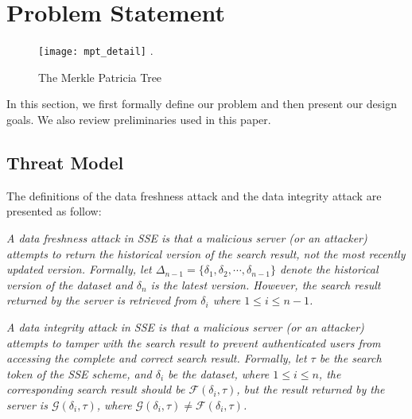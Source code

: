 \section{Problem Statement}
\begin{figure*}[t]
\centering
\texttt{[image: mpt\_detail]}
\DeclareGraphicsExtensions.
\caption{The Merkle Patricia Tree}
\label{fig:mpt_detail}
\end{figure*}

In this section, we first formally define our problem and then present our design goals. We also review preliminaries used in this paper.



\subsection{Threat Model}
 The definitions of the data freshness attack and the data integrity attack are presented as follow:

\begin{definition}\label{def:freshness}
    {\itshape
      A data freshness attack in SSE is that a malicious server (or an attacker) attempts to return the historical version of the search result, not the most recently updated version. Formally, let $\Delta_{n-1} = \{\delta_1,\delta_2,\cdots,\delta_{n-1}\}$ denote the historical version of the dataset and $\delta_n$ is the latest version. However, the search result returned by the server is retrieved from $\delta_i$ where $1 \le i \le n-1$.
    }
\end{definition}

\begin{definition}\label{def:integrity}
    {\itshape
      A data integrity attack in SSE is that a malicious server (or an attacker) attempts to tamper with the search result to prevent authenticated users from accessing the complete and correct search result. Formally, let $\tau$ be the search token of the SSE scheme, and $\delta_i$ be the dataset, where $1 \le i \le n$, the corresponding search result should be $\mathcal{F}(\delta_i, \tau)$, but the result returned by the server is $\mathcal{G}(\delta_i, \tau)$, where $\mathcal{G}(\delta_i, \tau) \neq \mathcal{F}(\delta_i, \tau)$.
    }
\end{definition}



